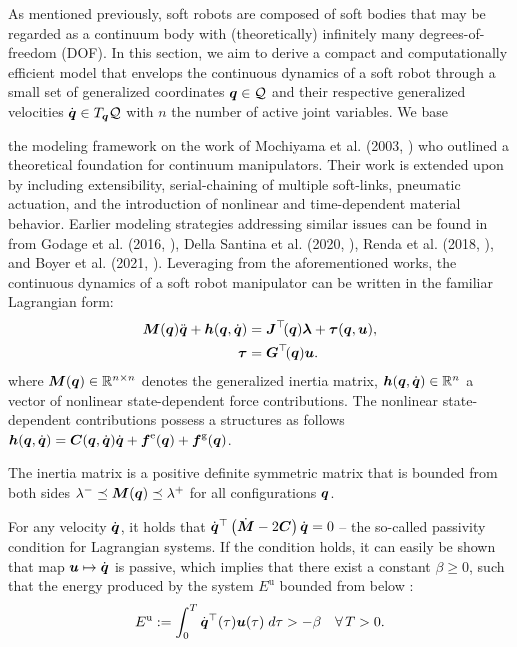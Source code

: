 As mentioned previously, soft robots are composed of soft bodies that may be regarded as a continuum body with (theoretically) infinitely many degrees-of-freedom (DOF). In this section, we aim to derive a compact and computationally efficient model that envelops the continuous dynamics of a soft robot through a small set of generalized coordinates ${\boldsymbol{q}}\in\mathcal{Q}$ and their respective generalized velocities ${\dot{\boldsymbol{q}}}\in T_{{\boldsymbol{q}}}\mathcal{Q}$ with $n$ the number of active joint variables. We base {the modeling framework on the work of Mochiyama et al. (2003, \cite{Mochiyama2003}) who outlined a theoretical foundation for continuum manipulators. Their work is extended upon by including extensibility, serial-chaining of multiple soft-links, pneumatic actuation, and the introduction of nonlinear and time-dependent material behavior. Earlier modeling strategies addressing similar issues can be found in from Godage et al. (2016, \cite{Godage2015,Godage2016}), Della Santina et al.  (2020, \cite{DellaSantina2020,DellaSantina2020a,DellaSantina2021}), Renda et al.
(2018, \cite{Renda2018}), and Boyer et al. (2021, \cite{Boyer2021}). Leveraging from the aforementioned works, the continuous dynamics of a soft robot manipulator can be written in the familiar Lagrangian form:
%
\begin{align}
{\boldsymbol{M}}({\boldsymbol{q}}) {\ddot{\boldsymbol{q}}} + \boldsymbol{h}({\boldsymbol{q}},{\dot{\boldsymbol{q}}}) & = \boldsymbol{J}^\top\!({\boldsymbol{q}}) \boldsymbol{\lambda} + \boldsymbol{\tau}({\boldsymbol{q}},\boldsymbol{u}), \label{eq:C2:model0}\\
\boldsymbol{\tau} & = \boldsymbol{G}^\top\!({\boldsymbol{q}}) \boldsymbol{u}.
\label{eq:C2:input_model0}
\end{align}
%
where ${\boldsymbol{M}}({\boldsymbol{q}})  \in \mathbb{R}^{n\times n}$ denotes the generalized inertia matrix, $\boldsymbol{h}({\boldsymbol{q}},{\dot{\boldsymbol{q}}}) \in \mathbb{R}^n$ a vector of nonlinear state-dependent force contributions. The nonlinear state-dependent contributions possess a structures as follows
$\boldsymbol{h}({\boldsymbol{q}},{\dot{\boldsymbol{q}}}) = \boldsymbol{C}({\boldsymbol{q}},{\dot{\boldsymbol{q}}}){\dot{\boldsymbol{q}}} + \boldsymbol{f}^{\textrm{e}}({\boldsymbol{q}}) + \boldsymbol{f}^{\textrm{g}} ({\boldsymbol{q}})$.
%

\begin{asm}
The inertia matrix is a positive definite symmetric matrix that is bounded from both sides $\lambda^{-} \preceq \boldsymbol{M}({\boldsymbol{q}}) \preceq \lambda^{+}$ for all configurations ${\boldsymbol{q}}$.
\end{asm}

\begin{asm}[Passivity]
For any velocity $\dot{{\boldsymbol{q}}}$, it holds that $\dot{{\boldsymbol{q}}}^\top\left(\dot{\boldsymbol{M}} - 2\boldsymbol{C}  \right)\dot{{\boldsymbol{q}}} = 0$ -- the so-called passivity condition for Lagrangian systems. If the condition holds, it can easily be shown that map ${\boldsymbol{u}} \mapsto \dot{{\boldsymbol{q}}}$ is passive, which implies that there exist a constant $\beta \ge 0$, such that the energy produced by the system $E^{\textrm{u}}$ bounded from below \cite{Ortega1998}:
%
\begin{equation}
E^{\textrm{u}} := \int_0^T {\dot{\boldsymbol{q}}}^\top(\tau) {\boldsymbol{u}}(\tau) \;d\tau > -\beta \quad \forall\,T > 0.
\label{as:C2:passivity}
\end{equation}
%
\end{asm}

}

